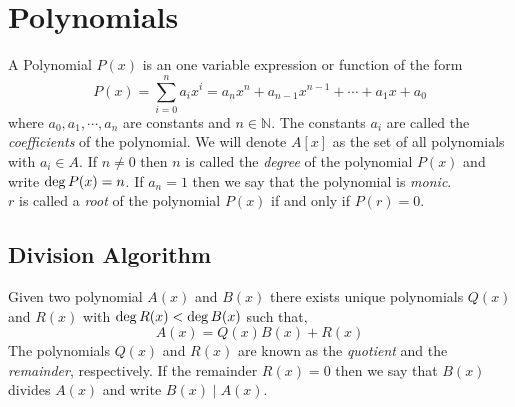 \chapter{Polynomials}

\begin{definition}
    A Polynomial $P(x)$ is an one variable expression or function of the form
    \[
        P(x) = \sum_{i=0}^{n} a_{i}x^{i} = a_{n}x^{n} + a_{n-1}x^{n-1} + \cdots +a_{1}x + a_{0}
    \]
    where $a_{0},a_{1}, \cdots, a_{n}$ are constants and $n \in \mathbb{N}$. The constants $a_{i}$ are called the 
    \textit{coefficients} of the polynomial. We will denote $A[x]$ as the set of all polynomials with $a_{i} \in A$. If 
    $n\neq 0$ then $n$ is called the \textit{degree} of the polynomial $P(x)$ and write $\operatorname{deg} P(x)=n$. 
    If $a_{n} = 1$ then we say that the polynomial is \textit{monic}. \\
    $r$ is called a \textit{root} of the polynomial $P(x)$ if and only if $P(r)=0$.
\end{definition}

\section{Division Algorithm}

\begin{theorem}\label{thm:division-algorithm}
    Given two polynomial $A(x)$ and $B(x)$ there exists unique polynomials $Q(x)$ and $R(x)$ with $\operatorname{deg} R(x) < \operatorname{deg} B(x)$ 
    such that,
    \[
        A(x) = Q(x)B(x) + R(x)
    \]
    The polynomials $Q(x)$ and $R(x)$ are known as the \textit{quotient} and the \textit{remainder}, respectively. If the 
    remainder $R(x)=0$ then we say that $B(x)$ divides $A(x)$ and write $B(x) \mid A(x)$.
\end{theorem}

